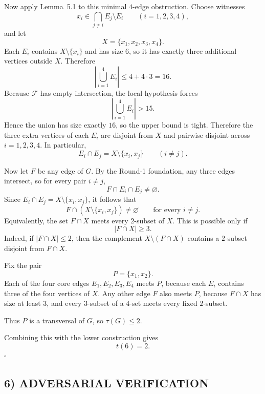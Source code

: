 Now apply Lemma~5.1 to this minimal $4$-edge obstruction. Choose witnesses
\[
x_i\in \bigcap_{j\ne i} E_j\setminus E_i
\qquad (i=1,2,3,4),
\]
and let
\[
X=\{x_1,x_2,x_3,x_4\}.
\]
Each $E_i$ contains $X\setminus\{x_i\}$ and has size $6$, so it has exactly three additional vertices outside $X$. Therefore
\[
\left|\bigcup_{i=1}^4 E_i\right|\le 4+4\cdot 3=16.
\]
Because $\mathcal{F}$ has empty intersection, the local hypothesis forces
\[
\left|\bigcup_{i=1}^4 E_i\right|>15.
\]
Hence the union has size exactly $16$, so the upper bound is tight. Therefore the three extra vertices of each $E_i$ are disjoint from $X$ and pairwise disjoint across $i=1,2,3,4$. In particular,
\[
E_i\cap E_j = X\setminus\{x_i,x_j\}
\qquad (i\ne j).
\]

Now let $F$ be any edge of $G$. By the Round-1 foundation, any three edges intersect, so for every pair $i\ne j$,
\[
F\cap E_i\cap E_j\ne \varnothing.
\]
Since $E_i\cap E_j=X\setminus\{x_i,x_j\}$, it follows that
\[
F\cap (X\setminus\{x_i,x_j\})\ne \varnothing
\qquad\text{for every } i\ne j.
\]
Equivalently, the set $F\cap X$ meets every $2$-subset of $X$. This is possible only if
\[
|F\cap X|\ge 3.
\]
Indeed, if $|F\cap X|\le 2$, then the complement $X\setminus (F\cap X)$ contains a $2$-subset disjoint from $F\cap X$.

Fix the pair
\[
P=\{x_1,x_2\}.
\]
Each of the four core edges $E_1,E_2,E_3,E_4$ meets $P$, because each $E_i$ contains three of the four vertices of $X$. Any other edge $F$ also meets $P$, because $F\cap X$ has size at least $3$, and every $3$-subset of a $4$-set meets every fixed $2$-subset.

Thus $P$ is a transversal of $G$, so $\tau(G)\le 2$.

Combining this with the lower construction gives
\[
t(6)=2.
\]
\hfill $\square$

\subsection*{6) ADVERSARIAL VERIFICATION}

